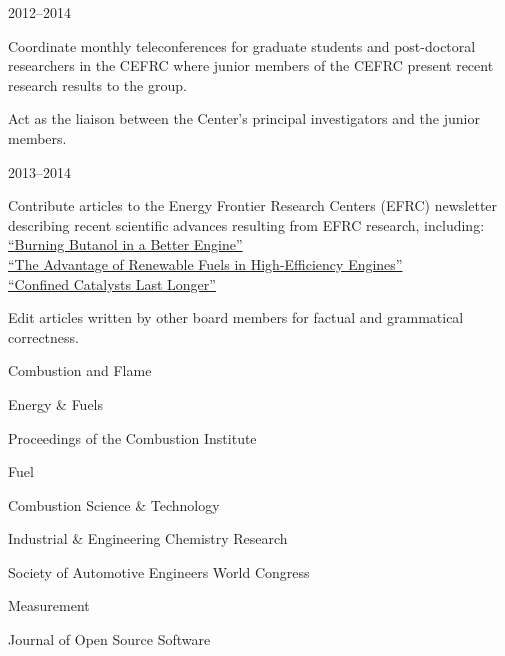 \begin{lonelist}
\item[]  \hfill 2012--2014\\

\begin{innerlist}
\item Coordinate monthly teleconferences for graduate students
and post-doctoral researchers in the CEFRC where junior members of
the CEFRC present recent research results to the group.
\item Act as the liaison between the Center's principal investigators
and the junior members.
\end{innerlist}

\item[]  \hfill 2013--2014\\

\begin{innerlist}
\item Contribute articles to the Energy Frontier Research Centers (EFRC)
newsletter describing recent scientific advances resulting from
EFRC research, including:\\
\hspace*{0.25in}\href{http://www.energyfrontier.us/newsletter/201210/burning-butanol-better-engine}
{``Burning Butanol in a Better Engine''}\\
\hspace*{0.25in}\href{http://www.energyfrontier.us/newsletter/201401/advantage-renewable-fuels-high-efficiency-engines}
{``The Advantage of Renewable Fuels in High-Efficiency Engines''}\\
\hspace*{0.25in}\href{http://www.energyfrontier.us/newsletter/201404/confined-catalysts-last-longer}
{``Confined Catalysts Last Longer''}
\item Edit articles written by other board members for factual and grammatical correctness.
\end{innerlist}

\item[] 
   \begin{innerlist}
       \item Combustion and Flame
       \item Energy \& Fuels
       \item Proceedings of the Combustion Institute
       \item Fuel
       \item Combustion Science \& Technology
       \item Industrial \& Engineering Chemistry Research
       \item Society of Automotive Engineers World Congress
       \item Measurement
       \item Journal of Open Source Software
   \end{innerlist}

\end{lonelist}

